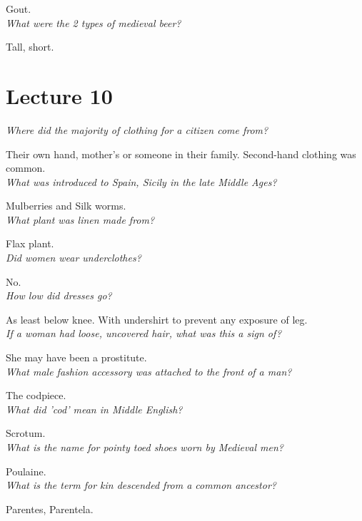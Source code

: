 \documentclass[12pt]{article}
\begin{document}
Gout.\\

\textit{What were the 2 types of medieval beer?}

Tall, short.\\


\section*{Lecture 10}

\textit{Where did the majority of clothing for a citizen come from?}

Their own hand, mother's or someone in their family. Second-hand clothing was common.\\

\textit{What was introduced to Spain, Sicily in the late Middle Ages?}

Mulberries and Silk worms.\\

\textit{What plant was linen made from?}

Flax plant.\\

\textit{Did women wear underclothes?}

No.\\

\textit{How low did dresses go?}

As least below knee. With undershirt to prevent any exposure of leg.\\

\textit{If a woman had loose, uncovered hair, what was this a sign of?}

She may have been a prostitute.\\

\textit{What male fashion accessory was attached to the front of a man?}

The codpiece.\\

\textit{What did 'cod' mean in Middle English?}

Scrotum.\\

\textit{What is the name for pointy toed shoes worn by Medieval men?}

Poulaine.\\

\textit{What is the term for kin descended from a common ancestor?}

Parentes, Parentela.\\
\end{document}
